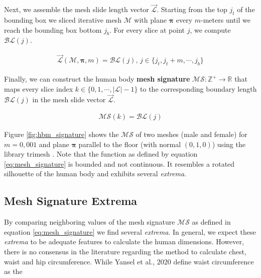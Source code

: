 \documentclass[runningheads]{llncs}
\begin{document}
Next, we assemble the mesh slide length vector $\vec{\mathcal{L}}$. Starting 
from the 
top $j_t$ of the bounding box we sliced iterative mesh $\mathcal{M}$ with plane 
$\boldsymbol{\pi}$ every $m$-meters until we reach the bounding box bottom 
$j_b$. For every slice at point $j$, we compute $\mathcal{BL}(j)$.

\begin{align}
\vec{\mathcal{L}}(\mathcal{M}, \boldsymbol{\pi}, m) = \mathcal{BL}(j), \, j 
\in 
\{j_t, j_t+m, \cdots, j_b\}
\end{align}

Finally, we can construct the human body \textbf{mesh signature} $\mathcal{MS}: 
\mathbb{Z}^+ \to \mathbb{R}$ that maps every slice index $k \in \{0, 1, \cdots, 
|\mathcal{L}|-1\}$ to the corresponding boundary length $\mathcal{BL}(j)$ in 
the mesh slide vector $\vec{\mathcal{L}}$.

\begin{align}\label{eq:mesh_signature}
\mathcal{MS}(k) = \mathcal{BL}(j)
\end{align}

Figure \ref{fig:hbm_signature} shows the $\mathcal{MS}$ of two meshes (male 
and female) for 
$m=0,001$ and plane $\boldsymbol{\pi}$ parallel to the floor (with normal $(0, 
1,0)$) using the library trimesh \cite{trimesh}. Note that the function as 
defined by equation \ref{eq:mesh_signature} is bounded and not continuous. It 
resembles a rotated silhouette of the human body and exhibits several 
\textit{extrema}.

\subsection{Mesh Signature Extrema}\label{subsec:mesh_signature_extrema}

By comparing neighboring values of the mesh signature $\mathcal{MS}$ as defined 
in equation \ref{eq:mesh_signature} we find several \textit{extrema}. In 
general, we expect these \textit{extrema} to be adequate features to 
calculate the human dimensions. However, there is no consensus in the 
literature regarding the method to calculate chest, waist and hip 
circumference. While Yansel et al., 2020 define waist circumference as the 
\end{document}
